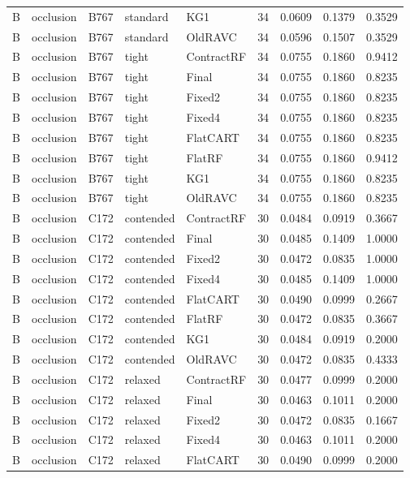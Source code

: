 \begin{longtable}{@{}lllllllll@{}}
B & occlusion & B767 & standard & KG1 & 34 & 0.0609 & 0.1379 & 0.3529\\
B & occlusion & B767 & standard & OldRAVC & 34 & 0.0596 & 0.1507 & 0.3529\\
B & occlusion & B767 & tight & ContractRF & 34 & 0.0755 & 0.1860 & 0.9412\\
B & occlusion & B767 & tight & Final & 34 & 0.0755 & 0.1860 & 0.8235\\
B & occlusion & B767 & tight & Fixed2 & 34 & 0.0755 & 0.1860 & 0.8235\\
B & occlusion & B767 & tight & Fixed4 & 34 & 0.0755 & 0.1860 & 0.8235\\
B & occlusion & B767 & tight & FlatCART & 34 & 0.0755 & 0.1860 & 0.8235\\
B & occlusion & B767 & tight & FlatRF & 34 & 0.0755 & 0.1860 & 0.9412\\
B & occlusion & B767 & tight & KG1 & 34 & 0.0755 & 0.1860 & 0.8235\\
B & occlusion & B767 & tight & OldRAVC & 34 & 0.0755 & 0.1860 & 0.8235\\
B & occlusion & C172 & contended & ContractRF & 30 & 0.0484 & 0.0919 & 0.3667\\
B & occlusion & C172 & contended & Final & 30 & 0.0485 & 0.1409 & 1.0000\\
B & occlusion & C172 & contended & Fixed2 & 30 & 0.0472 & 0.0835 & 1.0000\\
B & occlusion & C172 & contended & Fixed4 & 30 & 0.0485 & 0.1409 & 1.0000\\
B & occlusion & C172 & contended & FlatCART & 30 & 0.0490 & 0.0999 & 0.2667\\
B & occlusion & C172 & contended & FlatRF & 30 & 0.0472 & 0.0835 & 0.3667\\
B & occlusion & C172 & contended & KG1 & 30 & 0.0484 & 0.0919 & 0.2000\\
B & occlusion & C172 & contended & OldRAVC & 30 & 0.0472 & 0.0835 & 0.4333\\
B & occlusion & C172 & relaxed & ContractRF & 30 & 0.0477 & 0.0999 & 0.2000\\
B & occlusion & C172 & relaxed & Final & 30 & 0.0463 & 0.1011 & 0.2000\\
B & occlusion & C172 & relaxed & Fixed2 & 30 & 0.0472 & 0.0835 & 0.1667\\
B & occlusion & C172 & relaxed & Fixed4 & 30 & 0.0463 & 0.1011 & 0.2000\\
B & occlusion & C172 & relaxed & FlatCART & 30 & 0.0490 & 0.0999 & 0.2000\\

\end{longtable}
